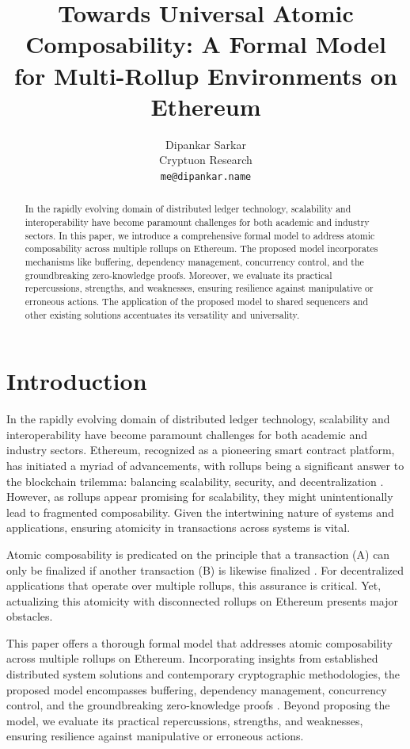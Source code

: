 \documentclass{article}
\title{Towards Universal Atomic Composability: A Formal Model for Multi-Rollup Environments on Ethereum}
\author{Dipankar Sarkar \\
  Cryptuon Research \\
  \texttt{me@dipankar.name} \\
}
\begin{document}
\maketitle

\begin{abstract}
In the rapidly evolving domain of distributed ledger technology, scalability and interoperability have become paramount challenges for both academic and industry sectors. In this paper, we introduce a comprehensive formal model to address atomic composability across multiple rollups on Ethereum. The proposed model incorporates mechanisms like buffering, dependency management, concurrency control, and the groundbreaking zero-knowledge proofs. Moreover, we evaluate its practical repercussions, strengths, and weaknesses, ensuring resilience against manipulative or erroneous actions. The application of the proposed model to shared sequencers and other existing solutions accentuates its versatility and universality.
\end{abstract}

\section{Introduction}\label{introduction}

In the rapidly evolving domain of distributed ledger technology, scalability and interoperability have become paramount challenges for both academic and industry sectors. Ethereum, recognized as a pioneering smart contract platform, has initiated a myriad of advancements, with rollups being a significant answer to the blockchain trilemma: balancing scalability, security, and decentralization \cite{buterin2020ethereum}. However, as rollups appear promising for scalability, they might unintentionally lead to fragmented composability. Given the intertwining nature of systems and applications, ensuring atomicity in transactions across systems is vital.

Atomic composability is predicated on the principle that a transaction (A) can only be finalized if another transaction (B) is likewise finalized \cite{micali2016atomic}. For decentralized applications that operate over multiple rollups, this assurance is critical. Yet, actualizing this atomicity with disconnected rollups on Ethereum presents major obstacles.

This paper offers a thorough formal model that addresses atomic composability across multiple rollups on Ethereum. Incorporating insights from established distributed system solutions and contemporary cryptographic methodologies, the proposed model encompasses buffering, dependency management, concurrency control, and the groundbreaking zero-knowledge proofs \cite{ben2013snarks}. Beyond proposing the model, we evaluate its practical repercussions, strengths, and weaknesses, ensuring resilience against manipulative or erroneous actions.
\end{document}

